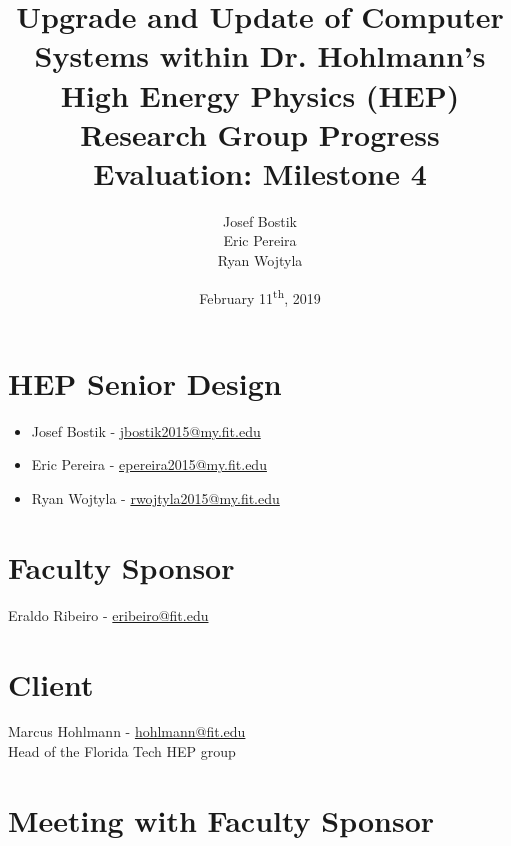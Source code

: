 \documentclass[12pt]{article}
\newcommand\tab[1][1cm]{\hspace*{#1}}
\begin{document}
	

\begin{titlepage}
	
\author{Josef Bostik\\
	Eric Pereira\\
	Ryan Wojtyla\\}
\date{February 11\textsuperscript{th}, 2019}
\title{Upgrade and Update of Computer Systems within Dr. Hohlmann’s High Energy Physics (HEP) Research Group Progress Evaluation: Milestone 4}

\maketitle

\end{titlepage}

\tableofcontents

\newpage {}

\section{HEP Senior Design}

\begin{itemize}
	\item Josef Bostik - \href{mailto:jbostik2015@my.fit.edu}{jbostik2015@my.fit.edu}
	\item Eric Pereira - \href{mailto:epereira2015@my.fit.edu}{epereira2015@my.fit.edu }
	\item Ryan Wojtyla - \href{mailto:rwojtyla2015@my.fit.edu}{rwojtyla2015@my.fit.edu}
\end{itemize}

\section{Faculty Sponsor}

\tab Eraldo Ribeiro - \href{mailto:eribeiro@fit.edu}{eribeiro@fit.edu}

\section{Client}

\tab Marcus Hohlmann - \href{mailto:hohlmann@fit.edu}{hohlmann@fit.edu} \\ 
\tab Head of the Florida Tech HEP group

\section{Meeting with Faculty Sponsor}
\end{document}
